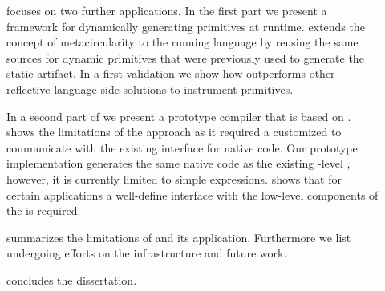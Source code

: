 \begin{description}
\item[] focuses on two further \B applications.
	In the first part we present \WF a framework for dynamically generating primitives at runtime.
	\WF extends the concept of metacircularity to the running language by reusing the same sources for dynamic primitives that were previously used to generate the static \VM artifact.
	In a first validation we show how \WF outperforms other reflective language-side solutions to instrument primitives.
	
	In a second part of  we present \NBJ a prototype \JIT compiler that is based on \B.
	\NBJ shows the limitations of the \B approach as it required a customized \VM to communicate with the existing \JIT interface for native code.
	Our prototype implementation generates the same native code as the existing \VM-level \JIT, however, it is currently limited to simple expressions.
	\NBJ shows that for certain applications a well-define interface with the low-level components of the \VM is required.

\item[] summarizes the limitations of \B and its application.
Furthermore we list undergoing efforts on the \B infrastructure and future work.

\item[] concludes the dissertation.

\end{description}



